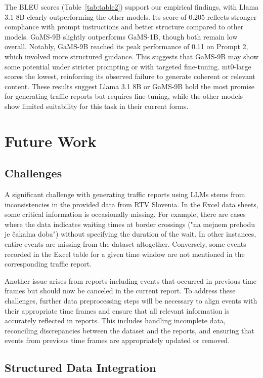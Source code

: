 \documentclass[fleqn,moreauthors,10pt]{ds_report}
\begin{document}
The BLEU scores (Table~\ref{tab:table2}) support our empirical findings, with Llama 3.1 8B clearly outperforming the other models. Its score of 0.205 reflects stronger compliance with prompt instructions and better structure compared to other models. GaMS-9B slightly outperforms GaMS-1B, though both remain low overall. Notably, GaMS-9B reached its peak performance of 0.11 on Prompt 2, which involved more structured guidance. This suggests that GaMS-9B may show some potential under stricter prompting or with targeted fine-tuning. mt0-large scores the lowest, reinforcing its observed failure to generate coherent or relevant content. These results suggest Llama 3.1 8B or GaMS-9B hold the most promise for generating traffic reports but requires fine-tuning, while the other models show limited suitability for this task in their current forms.

\section*{Future Work}

\subsection*{Challenges}

A significant challenge with generating traffic reports using LLMs stems from inconsistencies in the provided data from RTV Slovenia. In the Excel data sheets, some critical information is occasionally missing. For example, there are cases where the data indicates waiting times at border crossings ("na mejnem prehodu je čakalna doba") without specifying the duration of the wait. In other instances, entire events are missing from the dataset altogether. Conversely, some events recorded in the Excel table for a given time window are not mentioned in the corresponding traffic report.

Another issue arises from reports including events that occurred in previous time frames but should now be canceled in the current report. To address these challenges, further data preprocessing steps will be necessary to align events with their appropriate time frames and ensure that all relevant information is accurately reflected in reports. This includes handling incomplete data, reconciling discrepancies between the dataset and the reports, and ensuring that events from previous time frames are appropriately updated or removed.


\subsection*{Structured Data Integration}
\end{document}
